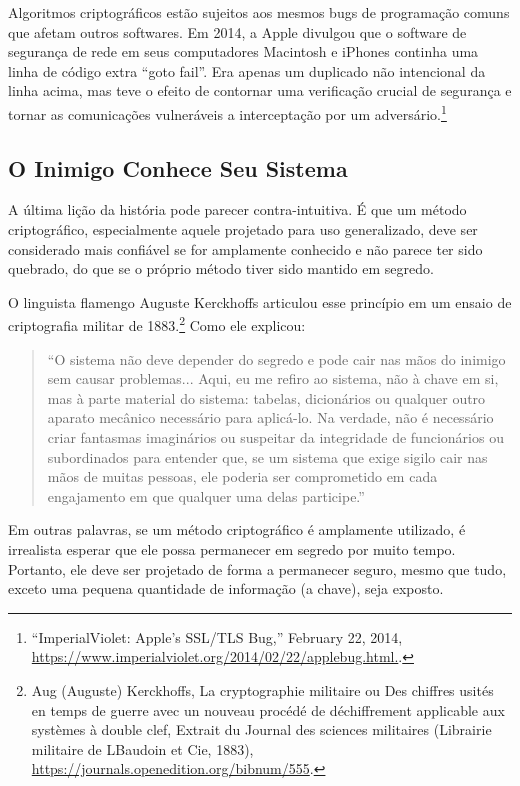 \documentclass{book}
\begin{document}
Algoritmos criptográficos estão sujeitos aos mesmos bugs de programação comuns que afetam outros softwares. Em 2014, a Apple divulgou que o software de segurança de rede em seus computadores Macintosh e iPhones continha uma linha de código extra ``goto fail''. Era apenas um duplicado não intencional da linha acima, mas teve o efeito de contornar uma verificação crucial de segurança e tornar as comunicações vulneráveis a interceptação por um adversário.\footnote{“ImperialViolet: Apple’s SSL/TLS Bug,” February 22, 2014, \url{https://www.imperialviolet.org/2014/02/22/applebug.html.}.}


\subsection{O Inimigo Conhece Seu Sistema}
\label{segredos:inimigo}

A última lição da história pode parecer contra-intuitiva. É que um método criptográfico, especialmente aquele projetado para uso generalizado, deve ser considerado mais confiável se for amplamente conhecido e não parece ter sido quebrado, do que se o próprio método tiver sido mantido em segredo.

O linguista flamengo Auguste Kerckhoffs articulou esse princípio em um ensaio de criptografia militar de 1883.\footnote{Aug (Auguste) Kerckhoffs, La cryptographie militaire ou Des chiffres usités en temps de guerre avec un nouveau procédé de déchiffrement applicable aux systèmes à double clef, Extrait du Journal des sciences militaires (Librairie militaire de LBaudoin et Cie, 1883), \url{https://journals.openedition.org/bibnum/555}.} Como ele explicou:

\begin{quote}
    ``O sistema não deve depender do segredo e pode cair nas mãos do inimigo sem causar problemas... Aqui, eu me refiro ao sistema, não à chave em si, mas à parte material do sistema: tabelas, dicionários ou qualquer outro aparato mecânico necessário para aplicá-lo. Na verdade, não é necessário criar fantasmas imaginários ou suspeitar da integridade de funcionários ou subordinados para entender que, se um sistema que exige sigilo cair nas mãos de muitas pessoas, ele poderia ser comprometido em cada engajamento em que qualquer uma delas participe.''
\end{quote}

Em outras palavras, se um método criptográfico é amplamente utilizado, é irrealista esperar que ele possa permanecer em segredo por muito tempo. Portanto, ele deve ser projetado de forma a permanecer seguro, mesmo que tudo, exceto uma pequena quantidade de informação (a chave), seja exposto.
\end{document}

